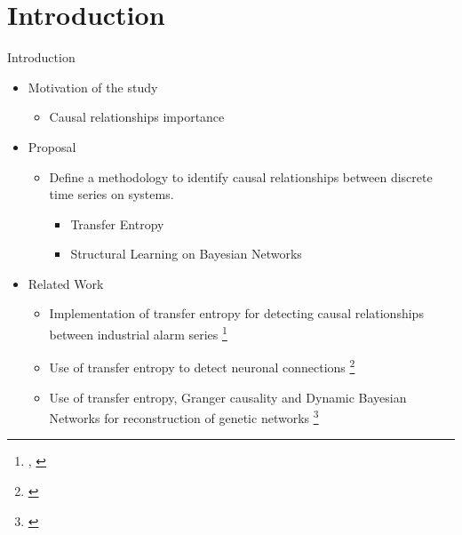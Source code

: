 \section{Introduction}

\begin{frame}{Introduction}

    \begin{itemize}
        \item Motivation of the study
        \begin{itemize}
            \item Causal relationships importance
        \end{itemize}
        
        \item Proposal
            \begin{itemize}
            \item Define a methodology to identify causal relationships between discrete time series on systems.
                \begin{itemize}
                    \item Transfer Entropy
                    \item Structural Learning on Bayesian Networks
                \end{itemize}
            \end{itemize}
            
        \item Related Work
            \begin{itemize}
                \item {Implementation of transfer entropy for detecting causal relationships between industrial alarm series \footnote{
                \cite{su2017capturing} 
                \cite{hu2017cause},
                \cite{yu2015detection}}}
                
                \item {Use of transfer entropy to detect neuronal connections \footnote{\cite{vicente2011transfer}}}
                
                \item {Use of transfer entropy, Granger causality and Dynamic Bayesian Networks for reconstruction of genetic networks \footnote{
                \cite{tung2007inferring}
                \cite{zou2009granger}}}
                
                
            \end{itemize}
    \end{itemize}

\end{frame}